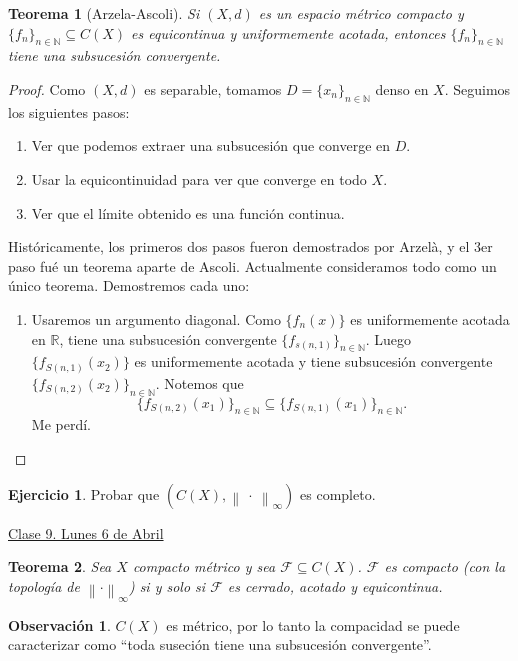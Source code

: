 \documentclass{article}
\newtheorem{theorem}{Teorema}[subsection]
\theoremstyle{definition}
\newtheorem{exercise}{Ejercicio}
\newtheorem*{obs}{Observación}
\theoremstyle{remark}
\numberwithin{equation}{section}
\newcommand{\N}{\mathbb{N}}
\newcommand{\R}{\mathbb{R}}
\newcommand{\Fcal}{\mathcal{F}}
\newcommand{\oo}{\infty}
\newcommand{\norm}[1]{\left\lVert #1 \right\rVert}
\newcommand{\fecha}[1]{\begin{flushright} \underline{#1} \end{flushright}}
\begin{document}
\begin{theorem}
  [Arzela-Ascoli]
  Si $(X,d)$ es un espacio métrico compacto y $\{f_n\}_{n\in\N} \subseteq C(X)$ es equicontinua y uniformemente acotada, entonces $\{f_n\}_{n\in\N}$ tiene una subsucesión convergente.
\end{theorem}
\begin{proof}
  Como $(X,d)$ es separable, tomamos $D = \{x_n\}_{n\in\N}$ denso en $X$. Seguimos los siguientes pasos:
  \begin{enumerate}[(1)]
    \item Ver que podemos extraer una subsucesión que converge en $D$.
    \item Usar la equicontinuidad para ver que converge en todo $X$.
    \item Ver que el límite obtenido es una función continua.
  \end{enumerate}
  Históricamente, los primeros dos pasos fueron demostrados por Arzelà, y el 3er paso fué un teorema aparte de Ascoli. Actualmente consideramos todo como un único teorema.
  Demostremos cada uno:
  \begin{enumerate}[(1)]
    \item Usaremos un argumento diagonal. Como $\{f_n(x)\}$ es uniformemente acotada en $\R$, tiene una subsucesión convergente $\{f_{s(n,1)}\}_{n \in \N}$. Luego $\{f_{S(n,1)}(x_2)\}$ es uniformemente acotada y tiene subsucesión convergente $\{f_{S(n,2)}(x_2)\}_{n\in\N}$. Notemos que
    \[\{f_{S(n,2)}(x_1)\}_{n\in\N} \subseteq \{f_{S(n,1)}(x_1)\}_{n\in\N}.\]
    Me perdí.
  \end{enumerate}
\end{proof}

\begin{exercise}
  Probar que $(C(X), \norm{\ \cdot \ }_\oo)$ es completo.
\end{exercise}

\fecha{Clase 9. Lunes 6 de Abril}

\begin{theorem}
  Sea $X$ compacto métrico y sea $\Fcal \subseteq C(X)$. $\Fcal$ es compacto (con la topología de $\norm{\cdot}_\oo$) si y solo si $\Fcal$ es cerrado, acotado y equicontinua.
\end{theorem}

\begin{obs}
  $C(X)$ es métrico, por lo tanto la compacidad se puede caracterizar como ``toda suseción tiene una subsucesión convergente''.
\end{obs}
\end{document}
